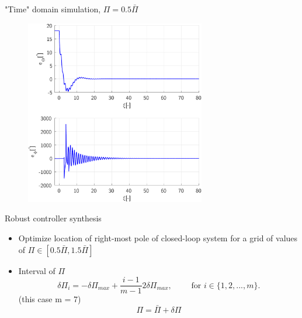 \documentclass{beamer}
\begin{document}
\begin{frame}{"Time" domain simulation, $\Pi = 0.5 \bar{\Pi}$}
		\begin{figure}[ht]\centering
			\includegraphics[width=0.7\textwidth]{images/ErrorsNeutralNominal.pdf}
		\end{figure}
\end{frame}

\begin{frame}{Robust controller synthesis}
	\begin{itemize}\setlength\itemsep{3.5em}
		\item Optimize location of right-most pole of closed-loop system for a grid of values of $\Pi \in [0.5 \bar{\Pi}, 1.5 \bar{\Pi}]$
		\item Interval of $\Pi$
		\begin{equation}
		\delta \Pi_i = -\delta \Pi_{max} + \frac{i - 1}{m - 1} 2\delta \Pi_{max}, \qquad \text{ for } i\in \{1,2,...,m\}. \nonumber 
		\end{equation} (this case m = 7)
		\begin{equation*}
		\Pi = \bar{\Pi} + \delta \Pi
		\end{equation*}
	\end{itemize}
\end{frame}
\end{document}
